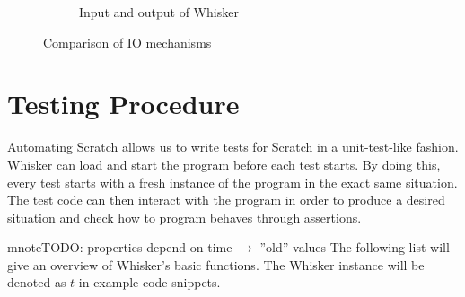 \begin{figure}[h]
\begin{subfigure}[b]{\textwidth}
        \caption{Input and output of Whisker}
        \label{fig:input_and_output_of_whisker}
    \end{subfigure}

    \caption{Comparison of IO mechanisms}
    \label{fig:comparison_of_io_mechanisms}
\end{figure}

\section{Testing Procedure}

Automating Scratch allows us to write tests for Scratch in a unit-test-like fashion.
Whisker can load and start the program before each test starts.
By doing this, every test starts with a fresh instance of the program in the exact same situation.
The test code can then interact with the program in order to produce a desired situation and check how to program behaves through assertions.
\parspace

mnote{TODO: properties depend on time $\rightarrow$ ''old'' values}
The following list will give an overview of Whisker's basic functions.
The Whisker instance will be denoted as $t$ in example code snippets.

